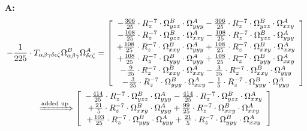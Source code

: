 \documentclass{article}
\begin{document}
\textbf{A:}
\begin{subequations}\begin{gather}
- \frac{1}{225} \cdot T_{\alpha{}\beta{}\gamma{}\delta{}\epsilon{}\zeta{}} \Omega{}^{B}_{\alpha{}\beta{}\gamma{}} \Omega{}^{A}_{\delta{}\epsilon{}\zeta{}} =  \left[ \begin{array}{c} 
 		- \frac{306}{25} \cdot R_{z}^{-7} \cdot \Omega{}^{B}_{yzz} \cdot \Omega{}^{A}_{yyy}- \frac{306}{25} \cdot R_{z}^{-7} \cdot \Omega{}^{B}_{yzz} \cdot \Omega{}^{A}_{xxy} 
 \\[0.2em] 		 - \frac{108}{25} \cdot R_{z}^{-7} \cdot \Omega{}^{B}_{yzz} \cdot \Omega{}^{A}_{xxy}- \frac{108}{25} \cdot R_{z}^{-7} \cdot \Omega{}^{B}_{yzz} \cdot \Omega{}^{A}_{yyy} 
 \\[0.2em] 		 + \frac{108}{25} \cdot R_{z}^{-7} \cdot \Omega{}^{B}_{xxy} \cdot \Omega{}^{A}_{yyy}+ \frac{108}{25} \cdot R_{z}^{-7} \cdot \Omega{}^{B}_{xxy} \cdot \Omega{}^{A}_{xxy} 
 \\[0.2em] 		 + \frac{108}{25} \cdot R_{z}^{-7} \cdot \Omega{}^{B}_{yyy} \cdot \Omega{}^{A}_{yyy}+ \frac{108}{25} \cdot R_{z}^{-7} \cdot \Omega{}^{B}_{yyy} \cdot \Omega{}^{A}_{xxy} 
 \\[0.2em] 		 - \frac{9}{25} \cdot R_{z}^{-7} \cdot \Omega{}^{B}_{xxy} \cdot \Omega{}^{A}_{xxy}- \frac{3}{25} \cdot R_{z}^{-7} \cdot \Omega{}^{B}_{xxy} \cdot \Omega{}^{A}_{yyy} 
 \\[0.2em] 		 - \frac{3}{25} \cdot R_{z}^{-7} \cdot \Omega{}^{B}_{yyy} \cdot \Omega{}^{A}_{xxy}- \frac{1}{5} \cdot R_{z}^{-7} \cdot \Omega{}^{B}_{yyy} \cdot \Omega{}^{A}_{yyy}
 \end{array}\right] 
\\ \xRightarrow{\text{added up}}
  \left[ \begin{array}{c} 
 		- \frac{414}{25} \cdot R_{z}^{-7} \cdot \Omega{}^{B}_{yzz} \cdot \Omega{}^{A}_{yyy}- \frac{414}{25} \cdot R_{z}^{-7} \cdot \Omega{}^{B}_{yzz} \cdot \Omega{}^{A}_{xxy} 
 \\[0.2em] 		 + \frac{21}{5} \cdot R_{z}^{-7} \cdot \Omega{}^{B}_{xxy} \cdot \Omega{}^{A}_{yyy}+ \frac{99}{25} \cdot R_{z}^{-7} \cdot \Omega{}^{B}_{xxy} \cdot \Omega{}^{A}_{xxy} 
 \\[0.2em] 		 + \frac{103}{25} \cdot R_{z}^{-7} \cdot \Omega{}^{B}_{yyy} \cdot \Omega{}^{A}_{yyy}+ \frac{21}{5} \cdot R_{z}^{-7} \cdot \Omega{}^{B}_{yyy} \cdot \Omega{}^{A}_{xxy}
 \end{array}\right] 
\end{gather}\end{subequations}
\end{document}
